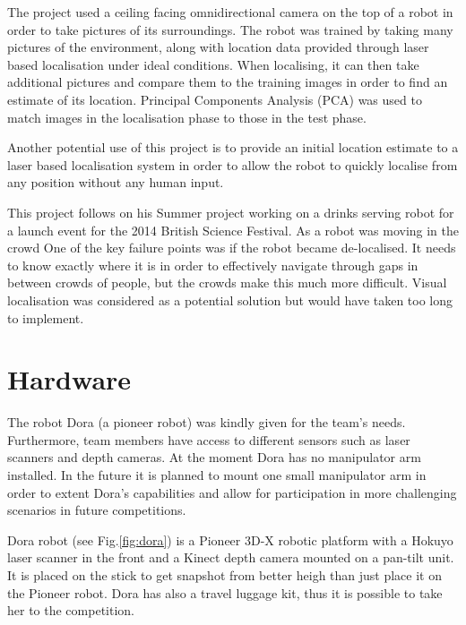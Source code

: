 \documentclass[conference]{IEEEtran}
\begin{document}
The project used a ceiling facing omnidirectional camera on the top of a robot in order to take pictures of its surroundings.
The robot was trained by taking many pictures of the environment, along with location data provided through laser based localisation under ideal conditions. When localising, it can then take additional pictures and compare them to the training images in order to find an estimate of its location. Principal Components Analysis (PCA) was used to match images in the localisation phase to those in the test phase. 

Another potential use of this project is to provide an initial location estimate to a laser based localisation system in order to allow the robot to quickly localise from any position without any human input.

This project follows on his Summer project working on a drinks serving robot for a launch event for the 2014 British Science Festival. As a robot was moving in the crowd One of the key failure points was if the robot became de-localised. It needs to know exactly where it is in order to effectively navigate through gaps in between crowds of people, but the crowds make this much more difficult. Visual localisation was considered as a potential solution but would have taken too long to implement.

\section{\label{sec:hardware}Hardware}
The robot Dora (a pioneer robot) was kindly given for the team's needs. Furthermore, team members have access to different sensors such as laser scanners and depth cameras. At the moment Dora has no manipulator arm installed. In the future it is planned to mount one small manipulator arm in order to extent Dora's capabilities and allow for participation in more challenging scenarios in future competitions.

Dora robot (see Fig.\ref{fig:dora}) is a Pioneer 3D-X robotic platform with a Hokuyo laser scanner in the front and a Kinect depth camera mounted on a pan-tilt unit. It is placed on the stick to get snapshot from better heigh than just place it on the Pioneer robot. Dora has also a travel luggage kit, thus it is possible to take her to the competition.
\end{document}
